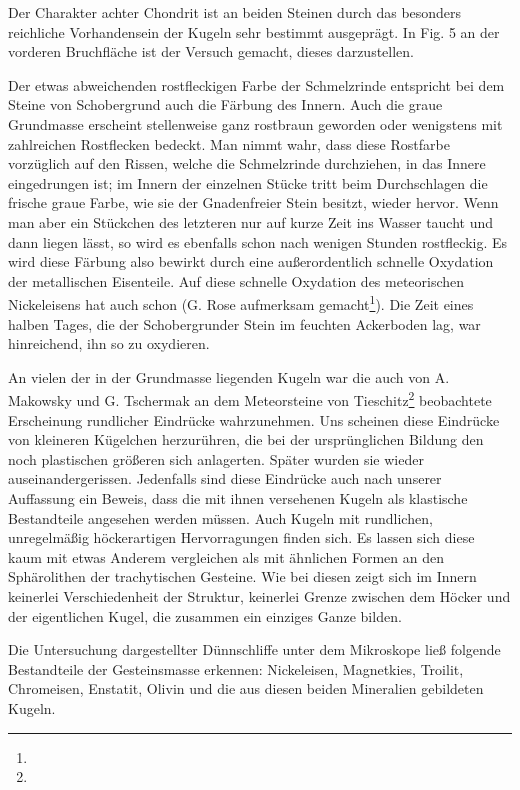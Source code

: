 \documentclass[a4paper, 11pt, oneside]{article}
\begin{document}
Der Charakter achter Chondrit ist an beiden Steinen durch das besonders reichliche Vorhandensein der Kugeln sehr bestimmt ausgeprägt. In Fig. 5 an der vorderen Bruchfläche ist der Versuch gemacht, dieses darzustellen.

Der etwas abweichenden rostfleckigen Farbe der Schmelzrinde entspricht bei dem Steine von Schobergrund auch die Färbung des Innern. Auch die graue Grundmasse erscheint stellenweise ganz rostbraun geworden oder wenigstens mit zahlreichen Rostflecken bedeckt. Man nimmt wahr, dass diese Rostfarbe vorzüglich auf den Rissen, welche die Schmelzrinde durchziehen, in das Innere eingedrungen ist; im Innern der einzelnen Stücke tritt beim Durchschlagen die frische graue Farbe, wie sie der Gnadenfreier Stein besitzt, wieder hervor. Wenn man aber ein Stückchen des letzteren nur auf kurze Zeit ins Wasser taucht und dann liegen lässt, so wird es ebenfalls schon nach wenigen Stunden rostfleckig. Es wird diese Färbung also bewirkt durch eine außerordentlich schnelle Oxydation der metallischen Eisenteile. Auf diese schnelle Oxydation des meteorischen Nickeleisens hat auch schon (G. Rose aufmerksam gemacht\footnote{}). Die Zeit eines halben Tages, die der Schobergrunder Stein im feuchten Ackerboden lag, war hinreichend, ihn so zu oxydieren.

An vielen der in der Grundmasse liegenden Kugeln war die auch von A. Makowsky und G. Tschermak an dem Meteorsteine von Tieschitz\footnote{} beobachtete Erscheinung rundlicher Eindrücke wahrzunehmen. Uns scheinen diese Eindrücke von kleineren Kügelchen herzurühren, die bei der ursprünglichen Bildung den noch plastischen größeren sich anlagerten. Später wurden sie wieder auseinandergerissen. Jedenfalls sind diese Eindrücke auch nach unserer Auffassung ein Beweis, dass die mit ihnen versehenen Kugeln als klastische Bestandteile angesehen werden müssen. Auch Kugeln mit rundlichen, unregelmäßig höckerartigen Hervorragungen finden sich. Es lassen sich diese kaum mit etwas Anderem vergleichen als mit ähnlichen Formen an den Sphärolithen der trachytischen Gesteine. Wie bei diesen zeigt sich im Innern keinerlei Verschiedenheit der Struktur, keinerlei Grenze zwischen dem Höcker und der eigentlichen Kugel, die zusammen ein einziges Ganze bilden.

Die Untersuchung dargestellter Dünnschliffe unter dem Mikroskope ließ folgende Bestandteile der Gesteinsmasse erkennen: Nickeleisen, Magnetkies, Troilit, Chromeisen, Enstatit, Olivin und die aus diesen beiden Mineralien gebildeten Kugeln.
\end{document}
